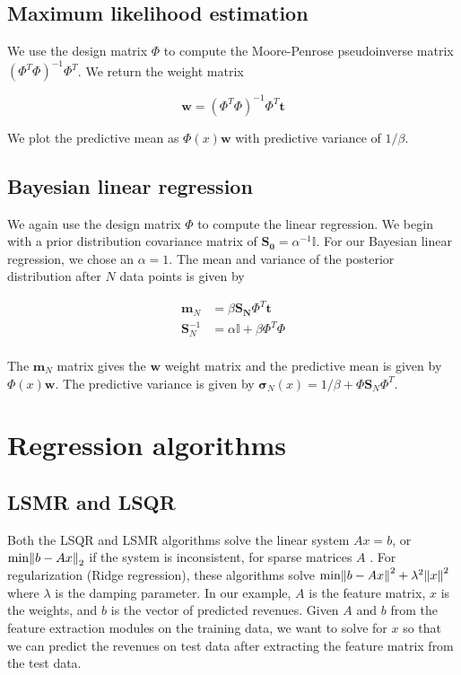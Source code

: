 \documentclass[11pt]{amsart}
\begin{document}
\subsection{Maximum likelihood estimation}

We use the design matrix $\Phi$ to compute the Moore-Penrose pseudoinverse matrix $(\Phi ^ T \Phi)^{-1} \Phi ^T$. We return the weight matrix 

$$\mathbf{w} = (\Phi ^ T \Phi)^{-1} \Phi ^T \mathbf{t}$$

We plot the predictive mean as $\Phi(x) \mathbf{w}$ with predictive variance of $1 / \beta$.

\subsection{Bayesian linear regression}

We again use the design matrix $\Phi$ to compute the linear regression. We begin with a prior distribution covariance matrix of $\mathbf{S_0} = \alpha ^{-1} \mathbb{I}$. For our Bayesian linear regression, we chose an $\alpha = 1$. The mean and variance of the posterior distribution after $N$ data points is given by

\begin{align*}
\mathbf{m}_N &= \beta \mathbf{S_N} \Phi ^ T \mathbf{t} \\
\mathbf{S}_N^{-1} &= \alpha \mathbb{I} + \beta \Phi ^ T \Phi \\
\end{align*}

The $\mathbf{m}_N$ matrix gives the $\mathbf{w}$ weight matrix and the predictive mean is given by $\Phi(x) \mathbf{w}$. The predictive variance is given by $\mathbf{\sigma}_N(x) = 1 / \beta + \Phi \mathbf{S}_N \Phi ^ T$. \\

\section{Regression algorithms}

\subsection{LSMR and LSQR}

Both the LSQR and LSMR algorithms solve the linear system $Ax=b$, or $\text{min}\norm{b-Ax}_2$ if the system is inconsistent, for sparse matrices $A$ \cite{LSMR}. For regularization (Ridge regression), these algorithms solve $\text{min}\norm{b-Ax}^2+\lambda^2\norm{x}^2$ where $\lambda$ is the damping parameter. In our example, $A$ is the feature matrix, $x$ is the weights, and $b$ is the vector of predicted revenues. Given $A$ and $b$ from the feature extraction modules on the training data, we want to solve for $x$ so that we can predict the revenues on test data after extracting the feature matrix from the test data.
\end{document}
